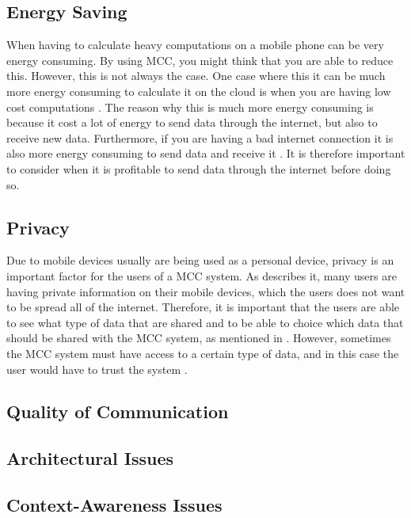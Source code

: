 
\subsection{Energy Saving}
When having to calculate heavy computations on a mobile phone can be very energy consuming.
By using MCC, you might think that you are able to reduce this.
However, this is not always the case.
One case where this it can be much more energy consuming to calculate it on the cloud is when you are having low cost computations \citep{goyalmobile,liu2013gearing}.
The reason why this is much more energy consuming is because it cost a lot of energy to send data through the internet, but also to receive new data.
Furthermore, if you are having a bad internet connection it is also more energy consuming to send data and receive it \citep{goyalmobile,liu2013gearing}.
It is therefore important to consider when it is profitable to send data through the internet before doing so.

\subsection{Privacy}
Due to mobile devices usually are being used as a personal device, privacy is an important factor for the users of a MCC system.
As \citet{liu2013gearing, fernando2013mobile} describes it, many users are having private information on their mobile devices, which the users does not want to be spread all of the internet.
Therefore, it is important that the users are able to see what type of data that are shared and to be able to choice which data that should be shared with the MCC system, as mentioned in \citet{sanaei2014heterogeneity}.
However, sometimes the MCC system must have access to a certain type of data, and in this case the user would have to trust the system \citep{fernando2013mobile}.



\subsection{Quality of Communication}

\subsection{Architectural Issues}

\subsection{Context-Awareness Issues}
